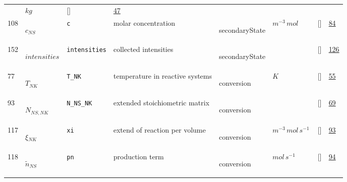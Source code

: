 \begin{longtable}{|p{1cm}|p{3cm}|p{3cm}|p{7cm}|p{3.0cm}|p{3cm}|p{2cm}|p{1cm}|}
             & $ kg \, $
             & []
             & \hyperlink{"e:47"}{ 47 }
                 \\
    108
             & \hypertarget{"v:108"}{ $ {c}{_{{N S}}} $}
             & \verb|c|
             & molar concentration
             & \begin{lay}secondaryState \end{lay}
             & $ m^{-3} \,mol \, $
             & []
             & \hyperlink{"e:84"}{ 84 }
                 \\
    152
             & \hypertarget{"v:152"}{ $ {intensities}{_{}} $}
             & \verb|intensities|
             & collected intensities
             & \begin{lay}secondaryState \end{lay}
             & $  $
             & []
             & \hyperlink{"e:126"}{ 126 }
                 \\
    77
             & \hypertarget{"v:77"}{ $ {T}{_{{N K}}} $}
             & \verb|T_NK|
             & temperature in reactive systems
             & \begin{lay}conversion \end{lay}
             & $ K \, $
             & []
             & \hyperlink{"e:55"}{ 55 }
                 \\
    93
             & \hypertarget{"v:93"}{ $ {N}{_{{N S}, {N K}}} $}
             & \verb|N_NS_NK|
             & extended stoichiometric matrix
             & \begin{lay}conversion \end{lay}
             & $  $
             & []
             & \hyperlink{"e:69"}{ 69 }
                 \\
    117
             & \hypertarget{"v:117"}{ $ {\xi}{_{{N K}}} $}
             & \verb|xi|
             & extend of reaction per volume
             & \begin{lay}conversion \end{lay}
             & $ m^{-3} \,mol \,s^{-1} \, $
             & []
             & \hyperlink{"e:93"}{ 93 }
                 \\
    118
             & \hypertarget{"v:118"}{ $ {\tilde{n}}{_{{N S}}} $}
             & \verb|pn|
             & production term
             & \begin{lay}conversion \end{lay}
             & $ mol \,s^{-1} \, $
             & []
             & \hyperlink{"e:94"}{ 94 }
                 \\

\end{longtable}
